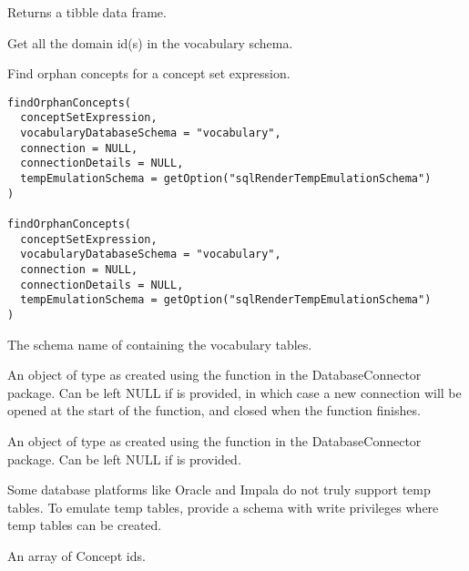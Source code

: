 \documentclass[a4paper]{book}
\begin{document}
%
\begin{Value}
Returns a tibble data frame.
\end{Value}
%
\begin{Description}\relax
Get all the domain id(s) in the vocabulary schema.

Find orphan concepts for a concept set expression.
\end{Description}
%
\begin{Usage}
\begin{verbatim}
findOrphanConcepts(
  conceptSetExpression,
  vocabularyDatabaseSchema = "vocabulary",
  connection = NULL,
  connectionDetails = NULL,
  tempEmulationSchema = getOption("sqlRenderTempEmulationSchema")
)

findOrphanConcepts(
  conceptSetExpression,
  vocabularyDatabaseSchema = "vocabulary",
  connection = NULL,
  connectionDetails = NULL,
  tempEmulationSchema = getOption("sqlRenderTempEmulationSchema")
)
\end{verbatim}
\end{Usage}
%
\begin{Arguments}
\begin{ldescription}
\item[\code{vocabularyDatabaseSchema}] The schema name of containing the vocabulary tables.

\item[\code{connection}] An object of type  as created using the
 function in the
DatabaseConnector package. Can be left NULL if 
is provided, in which case a new connection will be opened at the start
of the function, and closed when the function finishes.

\item[\code{connectionDetails}] An object of type  as created using the
 function in the
DatabaseConnector package. Can be left NULL if  is
provided.

\item[\code{tempEmulationSchema}] Some database platforms like Oracle and Impala do not truly support temp tables. To emulate temp 
tables, provide a schema with write privileges where temp tables can be created.

\item[\code{conceptIds}] An array of Concept ids.
\end{ldescription}
\end{Arguments}
\end{document}
